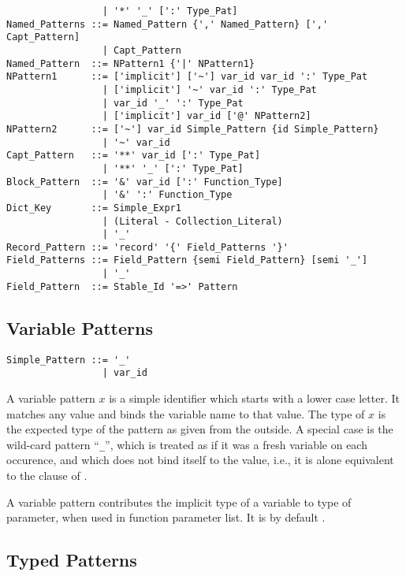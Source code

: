 \begin{lstlisting}
                 | '*' '_' [':' Type_Pat]
Named_Patterns ::= Named_Pattern {',' Named_Pattern} [',' Capt_Pattern]
                 | Capt_Pattern
Named_Pattern  ::= NPattern1 {'|' NPattern1}
NPattern1      ::= ['implicit'] ['~'] var_id var_id ':' Type_Pat
                 | ['implicit'] '~' var_id ':' Type_Pat
                 | var_id '_' ':' Type_Pat
                 | ['implicit'] var_id ['@' NPattern2]
NPattern2      ::= ['~'] var_id Simple_Pattern {id Simple_Pattern}
                 | '~' var_id
Capt_Pattern   ::= '**' var_id [':' Type_Pat]
                 | '**' '_' [':' Type_Pat]
Block_Pattern  ::= '&' var_id [':' Function_Type]
                 | '&' ':' Function_Type
Dict_Key       ::= Simple_Expr1
                 | (Literal - Collection_Literal)
                 | '_'
Record_Pattern ::= 'record' '{' Field_Patterns '}'
Field_Patterns ::= Field_Pattern {semi Field_Pattern} [semi '_']
                 | '_'
Field_Pattern  ::= Stable_Id '=>' Pattern
\end{lstlisting}






\subsection{Variable Patterns}
\label{sec:variable-patterns}

\syntax\begin{lstlisting}
Simple_Pattern ::= '_'
                 | var_id
\end{lstlisting}

A variable pattern $x$ is a simple identifier which starts with a lower case letter. It matches any value and binds the variable name to that value. The type of $x$ is the expected type of the pattern as given from the outside. A special case is the wild-card pattern ``\lstinline!_!'', which is treated as if it was a fresh variable on each occurence, and which does not bind itself to the value, i.e., it is alone equivalent to the  clause of . 

A variable pattern contributes the implicit type of a variable to type of parameter, when used in function parameter list. It is by default . 






\subsection{Typed Patterns}
\label{sec:typed-patterns}

